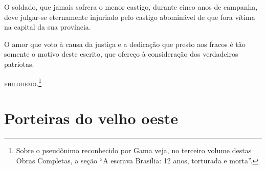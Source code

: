 O soldado, que jamais sofrera o menor castigo, durante cinco anos de
campanha, deve julgar-se eternamente injuriado pelo castigo abominável
de que fora vítima na capital da sua província.

O amor que voto à causa da justiça e a dedicação que presto aos fracos é
tão somente o motivo deste escrito, que ofereço à consideração dos
verdadeiros patriotas.

\begin{flushright}
\textsc{philodemo}.\footnote{Sobre o pseudônimo reconhecido por Gama veja, no
  terceiro volume destas Obras Completas, a seção ``A escrava Brasília:
  12 anos, torturada e morta''.}
\end{flushright}
\part{Porteiras do velho oeste}


